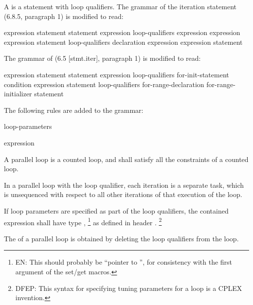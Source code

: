 
\pnum
A
is a
statement with loop qualifiers.
The grammar of the iteration statement (6.8.5, paragraph 1)
is modified to read:

\begin{bnf}
\br
{} \terminal{(} expression \terminal{)} statement
\br
{} statement  \terminal{(} expression \terminal{)} \terminal{;}
\br
{} loop-qualifiers\opt \terminal{(}
expression\opt \terminal{;}
expression\opt \terminal{;}
expression\opt \terminal{)} statement
\br
{} loop-qualifiers\opt \terminal{(}
declaration
expression\opt \terminal{;}
expression\opt \terminal{)} statement
\end{bnf}

\begin{cpp}
The grammar of
(6.5 [stmt.iter], paragraph 1)
is modified to read:

\begin{bnf}
\br
{} \terminal{(} expression \terminal{)} statement
\br
{} statement  \terminal{(} expression \terminal{)} \terminal{;}
\br
{} loop-qualifiers\opt \terminal{(}
for-init-statement
condition\opt \terminal{;}
expression\opt \terminal{)} statement
\br
{} loop-qualifiers\opt \terminal{(}
for-range-declaration \terminal{:}
for-range-initializer \terminal{)} statement
\end{bnf}

\end{cpp}

\pnum
The following rules are added to the grammar:

\begin{bnf}
\br
{} loop-parameters\opt
\end{bnf}

\begin{bnf}
\br
\terminal{[} expression \terminal{]}
\end{bnf}

\pnum
A parallel loop is a counted loop,
and shall satisfy all the constraints of a counted loop.

\pnum
In a parallel loop with the
loop qualifier,
each iteration is a separate task,
which is unsequenced with respect to
all other iterations of that execution of the loop.

\pnum
If loop parameters are specified as part of the loop qualifiers,
the contained expression shall have type
,%
\footnote{EN:
This should probably be
``pointer to '',
for consistency with the first argument of the set/get macros.
}
as defined in header
.%
\footnote{DFEP:
This syntax for specifying tuning parameters for a loop
is a CPLEX invention.
}

\pnum
The
of a parallel loop
is obtained by deleting the loop qualifiers from the loop.